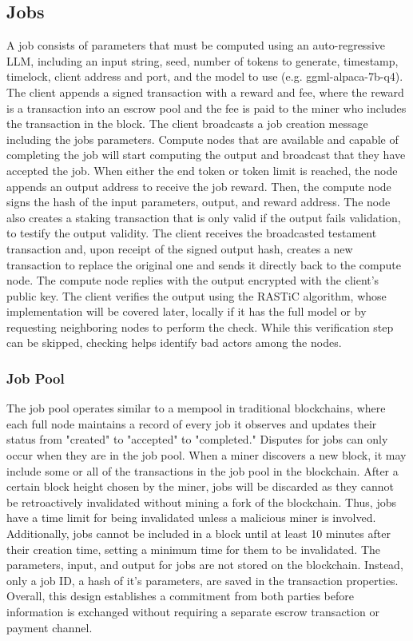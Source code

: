 \documentclass{article}
\begin{document}
\subsection{Jobs}
A job consists of parameters that must be computed using an auto-regressive LLM, including an input string, seed, number of tokens to generate, timestamp, timelock, client address and port, and the model to use (e.g. ggml-alpaca-7b-q4). 
The client appends a signed transaction with a reward and fee, where the reward is a transaction into an escrow pool and the fee is paid to the miner who includes the transaction in the block. 
The client broadcasts a job creation message including the jobs parameters.
Compute nodes that are available and capable of completing the job will start computing the output and broadcast that they have accepted the job. 
When either the end token or token limit is reached, the node appends an output address to receive the job reward. 
Then, the compute node signs the hash of the input parameters, output, and reward address. 
The node also creates a staking transaction that is only valid if the output fails validation, to testify the output validity. 
The client receives the broadcasted testament transaction and, upon receipt of the signed output hash, creates a new transaction to replace the original one and sends it directly back to the compute node. 
The compute node replies with the output encrypted with the client's public key. 
The client verifies the output using the \ac{RASTiC} algorithm, whose implementation will be covered later, locally if it has the full model or by requesting neighboring nodes to perform the check. 
While this verification step can be skipped, checking helps identify bad actors among the nodes.
\subsubsection{Job Pool}
The job pool operates similar to a mempool in traditional blockchains, where each full node maintains a record of every job it observes and updates their status from "created" to "accepted" to "completed."
 Disputes for jobs can only occur when they are in the job pool. 
 When a miner discovers a new block, it may include some or all of the transactions in the job pool in the blockchain. 
 After a certain block height chosen by the miner, jobs will be discarded as they cannot be retroactively invalidated without mining a fork of the blockchain. 
 Thus, jobs have a time limit for being invalidated unless a malicious miner is involved. 
 Additionally, jobs cannot be included in a block until at least 10 minutes after their creation time, setting a minimum time for them to be invalidated. 
 The parameters, input, and output for jobs are not stored on the blockchain. Instead, only a job ID, a hash of it's parameters, are saved in the transaction properties. 
 Overall, this design establishes a commitment from both parties before information is exchanged without requiring a separate escrow transaction or payment channel.
\end{document}
